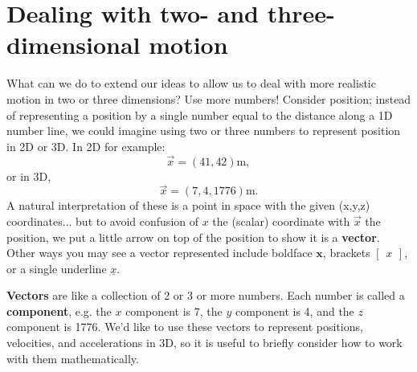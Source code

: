 \documentclass{tufte-handout}
\begin{document}
\section{Dealing with two- and three-dimensional motion}
What can we do to extend our ideas to allow us to deal with more realistic motion in two or three dimensions? Use more numbers!  Consider position; instead of representing a position by a single number equal to the distance along a 1D number line, we could imagine using two or three numbers to represent position in 2D or 3D. In 2D for example:
\begin{equation}
\vec{x} = (41, 42) \si{\meter},
\end{equation}
or in 3D, 
\begin{equation}
\vec{x} = (7,4,1776) \si{\meter}.
\end{equation}
A natural interpretation of these is a point in space with the given (x,y,z) coordinates... but to avoid confusion of $x$ the (scalar) coordinate with $\vec{x}$ the position, we put a little arrow on top of the position to show it is a \textbf{vector}.  Other ways you may see a vector represented include boldface $\mathbf{x}$, brackets $\begin{bmatrix} x\end{bmatrix}$, or a single underline $\underline{x}$.

\textbf{Vectors} are like a collection of 2 or 3 or more numbers. Each number is called a \textbf{component}, e.g. the $x$ component is 7, the $y$ component is 4, and the $z$ component is 1776.  We'd like to use these vectors to represent positions, velocities, and accelerations in 3D, so it is useful to briefly consider how to work with them mathematically.
\end{document}
